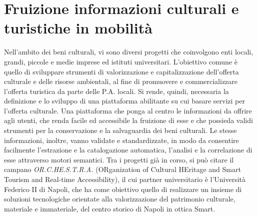 \section{Fruizione informazioni culturali e turistiche in mobilità}
Nell'ambito dei beni culturali, vi sono diversi progetti che coinvolgono enti locali, grandi, piccole e medie imprese ed istituti universitari.
L'obiettivo comune è quello di sviluppare strumenti di valorizzazione e capitalizzazione dell'offerta culturale e delle risorse ambientali, al fine di promuovere e commercializzare l'offerta turistica da parte delle P.A. locali.
Si rende, quindi, necessaria la definizione e lo sviluppo di una piattaforma abilitante su cui basare servizi per l'offerta culturale. Una piattaforma che ponga al centro le informazioni da offrire agli utenti, che renda facile ed accessibile la fruizione di esse e che possieda validi strumenti per la conservazione e la salvaguardia dei beni culturali.
Le stesse informazioni, inoltre, vanno validate e standardizzate, in modo da consentire facilmente l'estrazione e la catalogazione automatica, l'analisi e la correlazione di esse attraverso motori semantici.
Tra i progetti già in corso, si può citare il campano
\emph{OR.C.HE.S.T.R.A.} (ORganization of Cultural HEritage and Smart Tourism and Real-time Accessibility), il cui partner universitario è l'Università Federico II di Napoli, che ha come obiettivo quello di realizzare un insieme di soluzioni tecnologiche orientate alla valorizzazione del patrimonio culturale, materiale e immateriale, del centro storico di Napoli in ottica Smart. 


